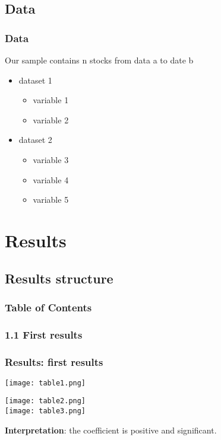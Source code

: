\documentclass{beamer}
\begin{document}
\subsection{Data}
\begin{frame}
	\frametitle{Data}
	Our sample contains n stocks from data a to date b\\
	\vspace{2mm}
	\begin{itemize}
		\item dataset 1
			\begin{itemize}
				\item variable 1
				\item variable 2
			\end{itemize}
		\item dataset 2
			\begin{itemize}
				\item variable 3
				\item variable 4
				\item variable 5
			\end{itemize}
	\end{itemize}
\end{frame}



\section{Results}
\subsection{Results structure}
  \begin{frame}
    \frametitle{Table of Contents}
     \tableofcontents
  [
  currentsection,
  sectionstyle=show/hide,
  subsectionstyle=show/shaded/hide,
  subsubsectionstyle=show/show/shaded
]
\end{frame}

\subsubsection{1.1 First results}
\begin{frame}
\frametitle{Results: first results}
\begin{minipage}{0.52\textwidth}
\texttt{[image: table1.png]}\\
\end{minipage}
\begin{minipage}[c]{0.43\textwidth}
\texttt{[image: table2.png]}\\
\texttt{[image: table3.png]}\\
\end{minipage}
\textbf{Interpretation}: the coefficient is positive and significant.\\

\end{frame}
\end{document}
